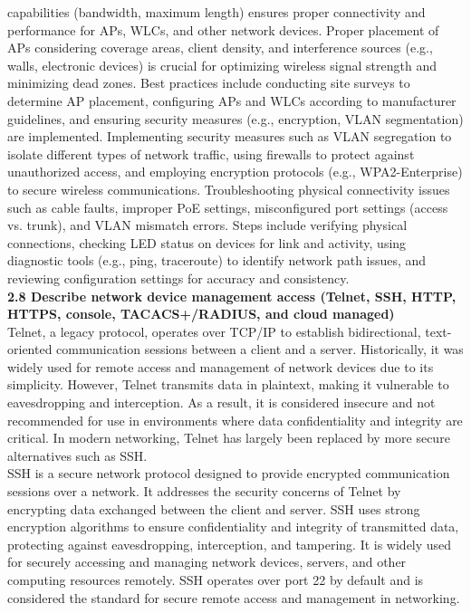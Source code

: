 \documentclass{article}
\begin{document}
capabilities (bandwidth, maximum length) ensures proper connectivity and performance for APs, WLCs, and other network devices. Proper placement of APs considering coverage areas, client density, and interference sources (e.g., walls, electronic devices) is crucial for optimizing wireless signal strength and minimizing dead zones. Best practices include conducting site surveys to determine AP placement, configuring APs and WLCs according to manufacturer guidelines, and ensuring security measures (e.g., encryption, VLAN segmentation) are implemented. Implementing security measures such as VLAN segregation to isolate different types of network traffic, using firewalls to protect against unauthorized access, and employing encryption protocols (e.g., WPA2-Enterprise) to secure wireless communications. Troubleshooting physical connectivity issues such as cable faults, improper PoE settings, misconfigured port settings (access vs. trunk), and VLAN mismatch errors. Steps include verifying physical connections, checking LED status on devices for link and activity, using diagnostic tools (e.g., ping, traceroute) to identify network path issues, and reviewing configuration settings for accuracy and consistency.\\
  
\noindent\textbf{2.8 Describe network device management access (Telnet, SSH, HTTP, HTTPS, console, TACACS+/RADIUS, and cloud managed)}\\

	Telnet, a legacy protocol, operates over TCP/IP to establish bidirectional, text-oriented communication sessions between a client and a server. Historically, it was widely used for remote access and management of network devices due to its simplicity. However, Telnet transmits data in plaintext, making it vulnerable to eavesdropping and interception. As a result, it is considered insecure and not recommended for use in environments where data confidentiality and integrity are critical. In modern networking, Telnet has largely been replaced by more secure alternatives such as SSH.\\
	
	SSH is a secure network protocol designed to provide encrypted communication sessions over a network. It addresses the security concerns of Telnet by encrypting data exchanged between the client and server. SSH uses strong encryption algorithms to ensure confidentiality and integrity of transmitted data, protecting against eavesdropping, interception, and tampering. It is widely used for securely accessing and managing network devices, servers, and other computing resources remotely. SSH operates over port 22 by default and is considered the standard for secure remote access and management in networking.\\
	
\end{document}
